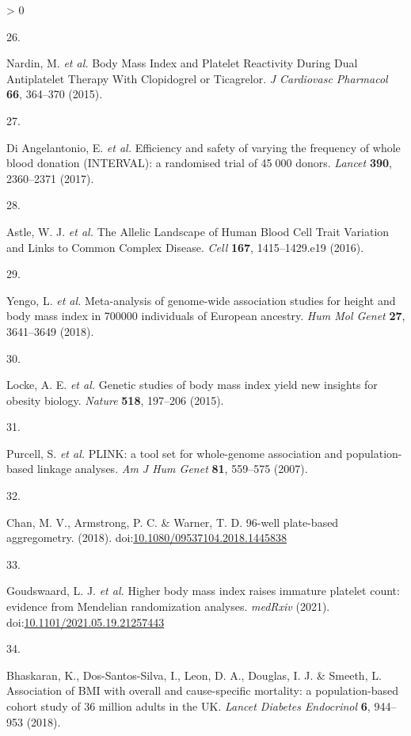 \documentclass[11pt,twoside]{bristolthesis}
\newlength{\cslhangindent}
\newlength{\csllabelwidth}
\newenvironment{CSLReferences}[2] %
 {%
  \setlength{\parindent}{0pt}
  \ifodd #1 \everypar{\setlength{\hangindent}{\cslhangindent}}\ignorespaces\fi
  \ifnum #2 > 0
  \setlength{\parskip}{#2\baselineskip}
  \fi
 }%
 {}
\newcommand{\CSLLeftMargin}[1]{\parbox[t]{\csllabelwidth}{#1}}
\newcommand{\CSLRightInline}[1]{\parbox[t]{\linewidth - \csllabelwidth}{#1}\break}
\begin{document}
\begin{CSLReferences}{0}{0}
\leavevmode\hypertarget{ref-Nardin2015}{}%
\CSLLeftMargin{26. }
\CSLRightInline{Nardin, M. \emph{et al.} {Body Mass Index and Platelet Reactivity During Dual Antiplatelet Therapy With Clopidogrel or Ticagrelor}. \emph{J Cardiovasc Pharmacol} \textbf{66}, 364--370 (2015).}

\leavevmode\hypertarget{ref-DiAngelantonio2017}{}%
\CSLLeftMargin{27. }
\CSLRightInline{Di Angelantonio, E. \emph{et al.} {Efficiency and safety of varying the frequency of whole blood donation (INTERVAL): a randomised trial of 45 000 donors}. \emph{Lancet} \textbf{390}, 2360--2371 (2017).}

\leavevmode\hypertarget{ref-Astle2016}{}%
\CSLLeftMargin{28. }
\CSLRightInline{Astle, W. J. \emph{et al.} {The Allelic Landscape of Human Blood Cell Trait Variation and Links to Common Complex Disease}. \emph{Cell} \textbf{167}, 1415--1429.e19 (2016).}

\leavevmode\hypertarget{ref-Yengo2018}{}%
\CSLLeftMargin{29. }
\CSLRightInline{Yengo, L. \emph{et al.} {Meta-analysis of genome-wide association studies for height and body mass index in 700000 individuals of European ancestry}. \emph{Hum Mol Genet} \textbf{27}, 3641--3649 (2018).}

\leavevmode\hypertarget{ref-Locke2015}{}%
\CSLLeftMargin{30. }
\CSLRightInline{Locke, A. E. \emph{et al.} {Genetic studies of body mass index yield new insights for obesity biology}. \emph{Nature} \textbf{518}, 197--206 (2015).}

\leavevmode\hypertarget{ref-Purcell2007a}{}%
\CSLLeftMargin{31. }
\CSLRightInline{Purcell, S. \emph{et al.} {PLINK: a tool set for whole-genome association and population-based linkage analyses}. \emph{Am J Hum Genet} \textbf{81}, 559--575 (2007).}

\leavevmode\hypertarget{ref-Chan2018}{}%
\CSLLeftMargin{32. }
\CSLRightInline{Chan, M. V., Armstrong, P. C. \& Warner, T. D. 96-well plate-based aggregometry. (2018). doi:\href{https://doi.org/10.1080/09537104.2018.1445838}{10.1080/09537104.2018.1445838}}

\leavevmode\hypertarget{ref-Goudswaard2021.05.19.21257443}{}%
\CSLLeftMargin{33. }
\CSLRightInline{Goudswaard, L. J. \emph{et al.} {Higher body mass index raises immature platelet count: evidence from Mendelian randomization analyses}. \emph{medRxiv} (2021). doi:\href{https://doi.org/10.1101/2021.05.19.21257443}{10.1101/2021.05.19.21257443}}

\leavevmode\hypertarget{ref-Bhaskaran2018a}{}%
\CSLLeftMargin{34. }
\CSLRightInline{Bhaskaran, K., Dos-Santos-Silva, I., Leon, D. A., Douglas, I. J. \& Smeeth, L. {Association of BMI with overall and cause-specific mortality: a population-based cohort study of 3{{}}6 million adults in the UK}. \emph{Lancet Diabetes Endocrinol} \textbf{6}, 944--953 (2018).}


\end{CSLReferences}
\end{document}
